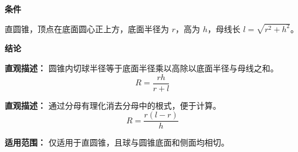 \begin{statementbox}
	\textbf{\textcolor{CStatement}{条件}}
	\begin{description}[style=nextline, leftmargin=2.8em, labelsep=0.5em, itemsep=0.35em]
		\item[\textbf{\textcolor{CStatement}{条件 1（几何前提）：}}]
			直圆锥，顶点在底面圆心正上方，底面半径为 $r$，高为 $h$，母线长 $l = \sqrt{r^2 + h^2}$。
	\end{description}
	\textbf{\textcolor{CStatement}{结论}}
	\begin{description}[style=nextline, leftmargin=2.8em, labelsep=0.5em, itemsep=0.45em]
		\item[\textbf{\textcolor{CStatement}{结论一（内切球半径）：}}]
			\textbf{\textcolor{CStatement}{直观描述：}}
			圆锥内切球半径等于底面半径乘以高除以底面半径与母线之和。
			\[
				R = \frac{rh}{r+l}
			\]
		\item[\textbf{\textcolor{CStatement}{常见变形（有理化形式）：}}]
			\textbf{\textcolor{CStatement}{直观描述：}}
			通过分母有理化消去分母中的根式，便于计算。
			\[
				R = \frac{r(l-r)}{h}
			\]
	\end{description}
	\textbf{\textcolor{CStatement}{适用范围：}}
	仅适用于直圆锥，且球与圆锥底面和侧面均相切。
\end{statementbox}
